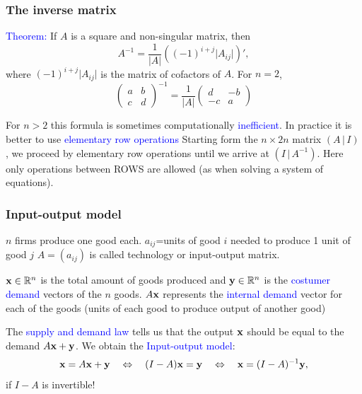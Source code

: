 \documentclass[11pt,aspectratio=169]{beamer}
\begin{document}
\begin{frame}
\frametitle{The inverse matrix}
\begin{small}
\textcolor{blue}{Theorem:} If $A$ is a square and non-singular matrix, then 
$$
A^{-1}=\frac{1}{\vert A \vert } ((-1)^{i+j} \vert A_{ij} \vert)',
$$ 
where $(-1)^{i+j} \vert A_{ij} \vert$ is the matrix of cofactors of $A$.
\vskip 10pt
For $n=2$, \begin{equation*}
 \begin{pmatrix}
a & b\\
c & d
\end{pmatrix}^{-1}=\frac{1}{\vert A \vert }\begin{pmatrix}
d & -b\\
-c & a
\end{pmatrix}
\end{equation*}

For $n>2$ this formula is sometimes computationally \textcolor{blue}{inefficient}. 
\vskip 10pt
In practice it is better to use \textcolor{blue}{elementary row operations} Starting form the $n \times 2n$ matrix $(A \, \vert\,  I)$,
we proceed by elementary row operations until we arrive at $(I \, \vert \, A^{-1})$.
Here only operations between ROWS are allowed (as when solving a system of equations).


\end{small}
\end{frame}





\begin{frame}
\frametitle{Input-output model}
\begin{small}
$n$ firms produce one good each.
\vskip 10pt
$a_{ij}$=units of good $i$ needed to produce 1 unit of good $j$
\vskip 10pt
$A=(a_{ij})$ is called technology or input-output matrix.

\vskip 10pt
${\bf x}\in \mathbb R^n$ is the total amount of goods produced and ${\bf y}\in \mathbb R^n$ is the \textcolor{blue}{costumer demand} vectors of the $n$ goods.
\vskip 10pt
$A{\bf x}$ represents the \textcolor{blue}{internal demand} vector for each of the goods (units of each good to produce output of another good)
\vskip 10pt

The \textcolor{blue}{supply and demand law} tells us that the output ${\bf x}$ should be equal to the demand $A\bf{x}+{\bf y}$. We obtain the \textcolor{blue}{Input-output model}: $${\bf x}=A{\bf x}+{\bf y} \quad \Leftrightarrow \quad (I-A){\bf x}={\bf y} \quad \Leftrightarrow \quad {\bf x}=(I-A)^{-1}{\bf y},$$
if $I-A$ is invertible!

\end{small}
\end{frame}
\end{document}
